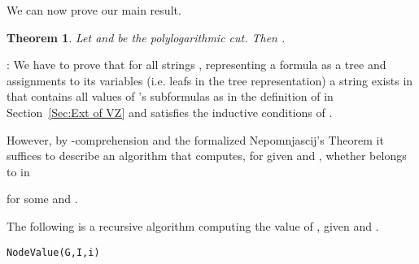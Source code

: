 \documentclass{LMCS}
\newtheorem{theorem}{Theorem}[section]
\newenvironment{proof}{\QuadSpace\par\noindent{\bf
Proof}:}{\EndProof\HalfSpace} \fi
\newcommand{\QuadSpace}{}\newcommand{\HalfSpace}{}\newcommand{\FullSpace}{}\newcommand{\EndProof}{ \hfill \vrule width 1ex height 1ex depth 0pt }
\newenvironment{proof}{

\smallskip
\noindent\emph{Proof.}}{\hfill
\bigskip
} \fi
\begin{document}
We can now prove our main result.
\begin{theorem}\label{thm:conclusion Nepo}
  Let  and  be the polylogarithmic cut. Then
  .
\end{theorem}


\begin{proof}
  We have to prove that for all strings , representing a formula  as a tree and
  assignments  to its variables (i.e. leafs in the tree representation) a string  exists in  that
  contains all values of 's subformulas as in the definition of  in Section~\ref{Sec:Ext of VZ}
  and satisfies the inductive conditions of .



  However, by -comprehension and the formalized
  Nepomnjascij's Theorem it suffices to describe an algorithm that
  computes, for given  and , whether  belongs to   in
  
  for some  and . 



The following is a recursive algorithm computing the value of , given  and .


\verb"NodeValue(G,I,i)"


\end{proof}
\end{document}
